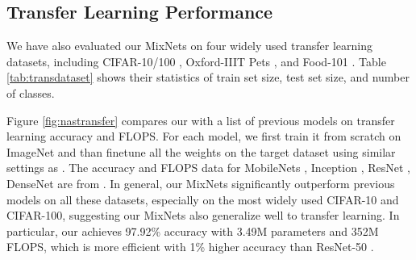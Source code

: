 \documentclass{sty/bmvc2k}
\begin{document}
\subsection{Transfer Learning Performance}

We have also evaluated our MixNets on four widely used transfer learning datasets, including CIFAR-10/100 \cite{cifar}, Oxford-IIIT Pets \cite{oxfordpets} , and Food-101 \cite{food101}. Table \ref{tab:transdataset} shows their statistics of train set size, test set size, and number of classes.

Figure \ref{fig:nastransfer} compares our  with a list of previous models on transfer learning accuracy and  FLOPS. For each model, we first train it from scratch on ImageNet and than finetune all the weights on the target dataset using similar settings as \cite{imagenettransfer18}. The accuracy and FLOPS data for MobileNets \cite{mobilenetv117,mobilenetv218}, Inception \cite{googlenet14}, ResNet \cite{resnet16}, DenseNet \cite{densenet17} are from \cite{imagenettransfer18}. In general, our MixNets significantly outperform previous models on all these datasets, especially on the most widely used CIFAR-10 and CIFAR-100, suggesting our MixNets also generalize well to transfer learning.
In particular, our  achieves 97.92\% accuracy with 3.49M parameters and 352M FLOPS,  which is  more efficient with 1\% higher accuracy than ResNet-50  \cite{resnet16}.
\end{document}
